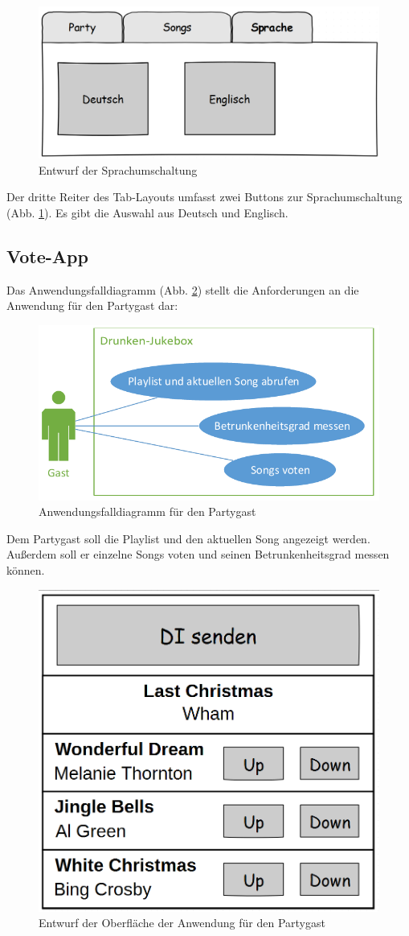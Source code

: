 \begin{figure}[H]
\centering
\includegraphics[width=0.6\linewidth]{Bilder/MockSprachen}
\caption{Entwurf der Sprachumschaltung}
\label{fig:MockSprachen}
\end{figure}

Der dritte Reiter des Tab-Layouts umfasst zwei Buttons zur Sprachumschaltung (Abb. \ref{fig:MockSprachen}). Es gibt die Auswahl aus Deutsch und Englisch.

\subsection{Vote-App}
Das Anwendungsfalldiagramm (Abb. \ref{fig:PartyPeopleUseCase}) stellt die Anforderungen an die Anwendung für den Partygast dar:

\begin{figure}[H]
\centering
\includegraphics[width=0.8\linewidth]{Bilder/PartyPeopleUseCase}
\caption{Anwendungsfalldiagramm für den Partygast}
\label{fig:PartyPeopleUseCase}
\end{figure}


Dem Partygast soll die Playlist und den aktuellen Song angezeigt werden. Außerdem soll er einzelne Songs voten und seinen Betrunkenheitsgrad messen können.

\begin{figure}[H]
\centering
\includegraphics[width=0.45\linewidth]{Bilder/MockPartyPeopleClient}
\caption{Entwurf der Oberfläche der Anwendung für den Partygast}
\label{fig:MockPartyPeopleClient}
\end{figure}

